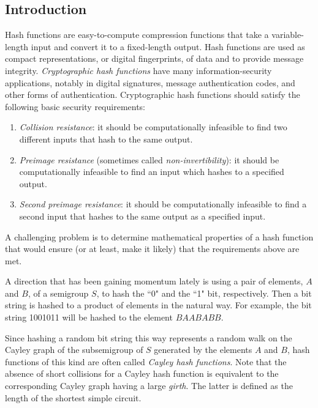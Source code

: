 \documentclass{lmsedition}
\begin{document}
\begin{twoblock}
 


\section*{Introduction}
 
Hash functions are easy-to-compute compression functions that take
a variable-length input and convert it to a fixed-length output.
Hash functions are used as compact representations, or digital
fingerprints, of data and to provide message integrity. {\it Cryptographic hash functions} have many information-security applications, notably in digital signatures, message authentication codes, and other forms of authentication. Cryptographic hash functions should satisfy the following basic security requirements:

\begin{enumerate}

\item {\it Collision resistance}: it should
be computationally infeasible to find two different inputs that hash
to the same output.

\item {\it Preimage resistance} (sometimes called {\it non-invertibility}): it should be
computationally infeasible to find an input which hashes to a specified output.

\item {\it Second preimage resistance}: it
should be computationally infeasible to find a second input that
hashes to the same output as a specified input.
 
\end{enumerate}

A challenging problem is to determine mathematical properties of a
hash function that would ensure (or at least, make it likely) that
the requirements above are met.
 
 A direction that has been gaining momentum lately is using a pair of
elements, $A$ and $B$, of a semigroup $S$, to hash the ``0" and the ``1" bit, respectively. Then a bit string is hashed to a product of elements in the natural way.
For example, the bit string 1001011 will be hashed to  the element $BAABABB$.

Since hashing a random bit string this way represents a random walk on the Cayley
graph of the subsemigroup of $S$ generated by the elements $A$ and $B$, hash functions of this kind are often called {\it Cayley hash functions}. Note that the absence of short collisions for a Cayley hash function is equivalent to the corresponding Cayley graph having a large {\it girth}. The latter is defined as the length of the shortest simple circuit.
 

\end{twoblock}
\end{document}
